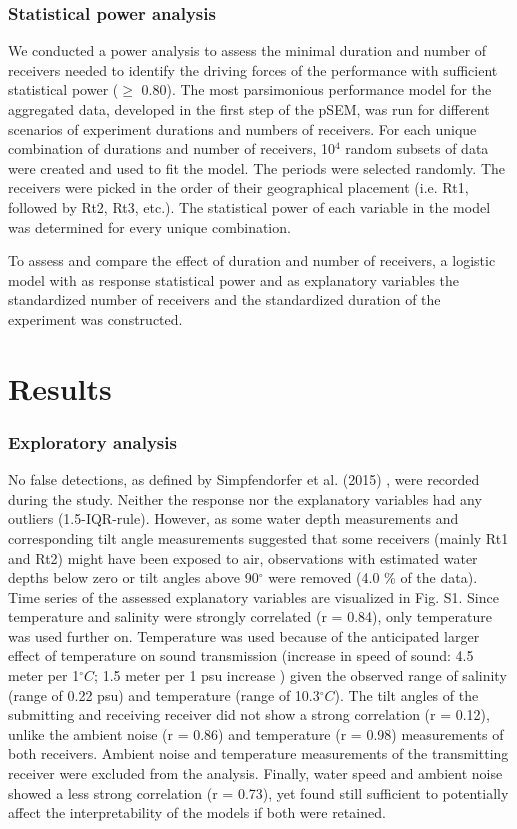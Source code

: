 \documentclass[doublespacing,linenumbers]{bmcart}
\begin{document}
\subsubsection*{Statistical power analysis}

We conducted a power analysis to assess the minimal duration and number of receivers needed to identify the driving forces of the performance with sufficient statistical power ($\geq$ 0.80). The most parsimonious performance model for the aggregated data, developed in the first step of the pSEM, was run for different scenarios of experiment durations and numbers of receivers. For each unique combination of durations and number of receivers, 10$^{4}$ random subsets of data were created and used to fit the model. The periods were selected randomly. The receivers were picked in the order of their geographical placement (i.e. Rt1, followed by Rt2, Rt3, etc.). The statistical power of each variable in the model was determined for every unique combination.  

To assess and compare the effect of duration and number of receivers, a logistic model with as response statistical power and as explanatory variables the standardized number of receivers and the standardized duration of the experiment was constructed.

\section*{Results}

\subsubsection*{Exploratory analysis}

No false detections, as defined by Simpfendorfer et al. (2015) \cite{Simpfendorfer2015GhostsEquipment}, were recorded during the study. Neither the response nor the explanatory variables had any outliers (1.5-IQR-rule). However, as some water depth measurements and corresponding tilt angle measurements suggested that some receivers (mainly Rt1 and Rt2) might have been exposed to air, observations with estimated water depths below zero or tilt angles above 90$^{\circ}$ were removed (4.0 \% of the data). Time series of the assessed explanatory variables are visualized in Fig. S1. Since temperature and salinity were strongly correlated (r = 0.84), only temperature was used further on. Temperature was used because of the anticipated larger effect of temperature on sound transmission (increase in speed of sound: 4.5 meter per 1$^\circ C$; 1.5 meter per 1 psu increase \cite{Belogolskii2002TemperatureSeawater}) given the observed range of salinity (range of 0.22 psu) and temperature (range of 10.3$^\circ C$). The tilt angles of the submitting and receiving receiver did not show a strong correlation (r = 0.12), unlike the ambient noise (r = 0.86) and temperature (r = 0.98) measurements of both receivers. Ambient noise and temperature measurements of the transmitting receiver were excluded from the analysis. Finally, water speed and ambient noise showed a less strong correlation (r = 0.73), yet found still sufficient to potentially affect the interpretability of the models if both were retained.
\end{document}

